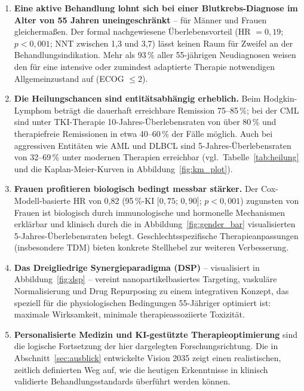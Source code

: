 ﻿\documentclass[12pt,a4paper]{article}
\theoremstyle{definition}
\begin{document}
\begin{enumerate}
  \item \textbf{Eine aktive Behandlung lohnt sich bei einer Blutkrebs-Diagnose im
        Alter von 55 Jahren uneingeschränkt} -- für Männer und Frauen
        gleichermaßen. Der formal nachgewiesene Überlebensvorteil (HR
        $=0{,}19$; $p<0{,}001$; NNT zwischen 1,3 und 3,7) lässt keinen Raum für
        Zweifel an der Behandlungsindikation. Mehr als 93\,\% aller 55-jährigen
        Neudiagnosen weisen den für eine intensive oder zumindest adaptierte
        Therapie notwendigen Allgemeinzustand auf (ECOG $\leq 2$).

  \item \textbf{Die Heilungschancen sind entitätsabhängig erheblich.}
        Beim Hodgkin-Lym\-phom beträgt die dauerhaft erreichbare Remission
        75--85\,\%; bei der CML sind unter TKI-Therapie 10-Jahres-Überlebensraten
        von über 80\,\% und therapiefreie Remissionen in etwa 40--60\,\% der
        Fälle möglich. Auch bei aggressiven Entitäten wie AML und DLBCL sind
        5-Jahres-Überlebensraten von 32--69\,\% unter modernen Therapien erreichbar
        (vgl.\ Tabelle~\ref{tab:heilung} und die Kaplan-Meier-Kurven in
        Abbildung~\ref{fig:km_plot}).

  \item \textbf{Frauen profitieren biologisch bedingt messbar stärker.}
        Der Cox-Modell-basierte HR von 0,82 (95\,\%-KI [$0{,}75$; $0{,}90$];
        $p<0{,}001$) zugunsten von Frauen ist biologisch durch immunologische
        und hormonelle Mechanismen erklärbar und klinisch durch die in
        Abbildung~\ref{fig:gender_bar} visualisierten 5-Jahres-Überlebensraten
        belegt. Geschlechtsspezifische Therapieanpassungen (insbesondere TDM)
        bieten konkrete Stellhebel zur weiteren Verbesserung.

  \item \textbf{Das Dreigliedrige Synergieparadigma (DSP)} -- visualisiert in
        Abbildung~\ref{fig:dsp} -- vereint nanopartikelbasiertes Targeting,
        vaskuläre Normalisierung und Drug Repurposing zu einem integrativen
        Konzept, das speziell für die physiologischen Bedingungen 55-Jähriger
        optimiert ist: maximale Wirksamkeit, minimale therapieassoziierte Toxizität.

  \item \textbf{Personalisierte Medizin und KI-gestützte Therapieoptimierung}
        sind die logische Fortsetzung der hier dargelegten Forschungsrichtung.
        Die in Abschnitt~\ref{sec:ausblick} entwickelte Vision 2035 zeigt einen
        realistischen, zeitlich definierten Weg auf, wie die heutigen Erkenntnisse
        in klinisch validierte Behandlungsstandards überführt werden können.
\end{enumerate}
\end{document}
